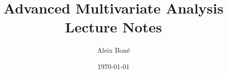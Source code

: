 



\usepackage{algpseudocode}


\renewcommand\and{\\[\baselineskip]}

\title{\Huge Advanced Multivariate Analysis\\ \Large Lecture Notes}
\author{Aleix Boné}
\date{\today}

\makeindex


\newcommand{\iemph}[1]{\index{#1}\emph{#1}}






\tableofcontents \pagebreak



\setlength{\parskip}{1em plus 0.5em minus 0.2em}

\setlength{\headheight}{14.5pt}
\pagestyle{fancy}






\nocite{*}

\listoffigures \listoftables \pagebreak
\printindex\pagebreak
\printbibliography


